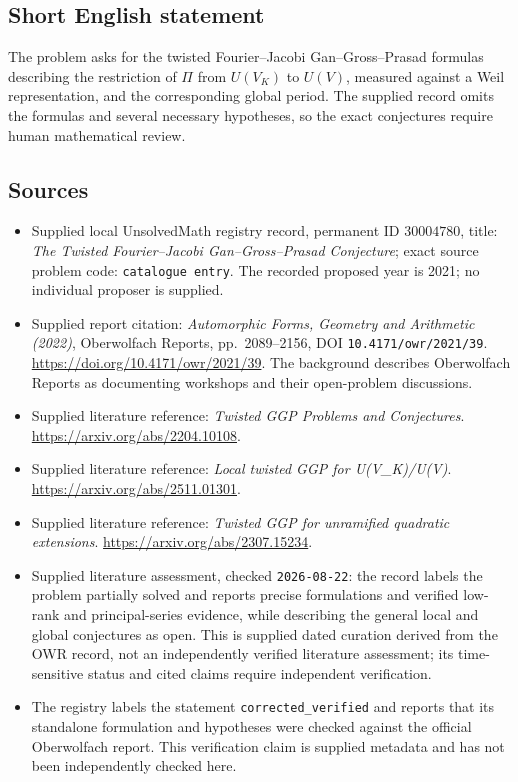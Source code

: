 \documentclass[11pt]{article}
\begin{document}
\subsection{Short English statement}
The problem asks for the twisted Fourier--Jacobi Gan--Gross--Prasad formulas describing the restriction of \(\Pi\) from \(U(V_K)\) to \(U(V)\), measured against a Weil representation, and the corresponding global period. The supplied record omits the formulas and several necessary hypotheses, so the exact conjectures require human mathematical review.
\subsection{Sources}
\begin{itemize}
\item Supplied local UnsolvedMath registry record, permanent ID \(30004780\), title: \emph{The Twisted Fourier--Jacobi Gan--Gross--Prasad Conjecture}; exact source problem code: \texttt{catalogue entry}. The recorded proposed year is 2021; no individual proposer is supplied.
\item Supplied report citation: \emph{Automorphic Forms, Geometry and Arithmetic (2022)}, Oberwolfach Reports, pp.\ 2089--2156, DOI \texttt{10.4171/owr/2021/39}. \url{https://doi.org/10.4171/owr/2021/39}. The background describes Oberwolfach Reports as documenting workshops and their open-problem discussions.
\item Supplied literature reference: \emph{Twisted GGP Problems and Conjectures}. \url{https://arxiv.org/abs/2204.10108}.
\item Supplied literature reference: \emph{Local twisted GGP for U(V\_K)/U(V)}. \url{https://arxiv.org/abs/2511.01301}.
\item Supplied literature reference: \emph{Twisted GGP for unramified quadratic extensions}. \url{https://arxiv.org/abs/2307.15234}.
\item Supplied literature assessment, checked \texttt{2026-08-22}: the record labels the problem partially solved and reports precise formulations and verified low-rank and principal-series evidence, while describing the general local and global conjectures as open. This is supplied dated curation derived from the OWR record, not an independently verified literature assessment; its time-sensitive status and cited claims require independent verification.
\item The registry labels the statement \texttt{corrected\_verified} and reports that its standalone formulation and hypotheses were checked against the official Oberwolfach report. This verification claim is supplied metadata and has not been independently checked here.
\end{itemize}
\end{document}
